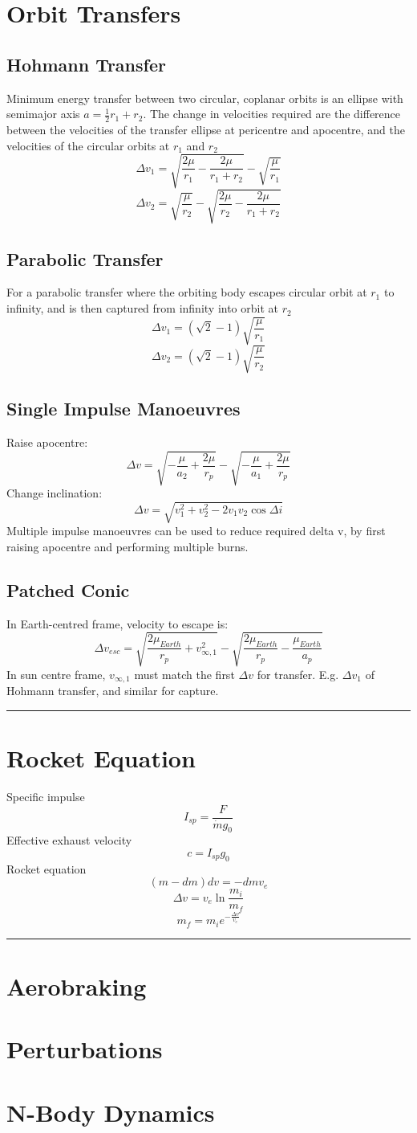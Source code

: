 \documentclass[table,cmyk]{article}
\begin{document}
\begin{longtable}
\section*{Orbit Transfers}
\subsection*{Hohmann Transfer}
Minimum energy transfer between two circular, coplanar orbits is an ellipse with semimajor axis $a = \frac{1}{2}r_1 + r_2$. The change in velocities required are the difference between the velocities of the transfer ellipse at pericentre and apocentre, and the velocities of the circular orbits at $r_1$ and $r_2$
\[\Delta v_1 = \sqrt{\frac{2\mu}{r_1}-\frac{2\mu}{r_1+r_2}}-\sqrt{\frac{\mu}{r_1}}\]
\[\Delta v_2 = \sqrt{\frac{\mu}{r_2}}-\sqrt{\frac{2\mu}{r_2}-\frac{2\mu}{r_1+r_2}}\]
\subsection*{Parabolic Transfer}
For a parabolic transfer where the orbiting body escapes circular orbit at $r_1$ to infinity, and is then captured from infinity into orbit at $r_2$
\[\Delta v_1 = (\sqrt{2}-1)\sqrt{\frac{\mu}{r_1}}\]
\[\Delta v_2 = (\sqrt{2}-1)\sqrt{\frac{\mu}{r_2}}\]
\subsection*{Single Impulse Manoeuvres}
Raise apocentre:
\[\Delta v = \sqrt{-\frac{\mu}{a_2}+\frac{2\mu}{r_p}}-\sqrt{-\frac{\mu}{a_1}+\frac{2\mu}{r_p}}\]
Change inclination:
\[\Delta v = \sqrt{v_1^2+v_2^2-2v_1v_2\cos \Delta i}\]
Multiple impulse manoeuvres can be used to reduce required delta v, by first raising apocentre and performing multiple burns.
\subsection*{Patched Conic}
In Earth-centred frame, velocity to escape is:
\[\Delta v_{esc} = \sqrt{\frac{2\mu_{Earth}}{r_p}+v_{\infty,1}^2}-\sqrt{\frac{2\mu_{Earth}}{r_p}-\frac{\mu_{Earth}}{a_p}}\]
\tabularnewline\hline
In sun centre frame, $v_{\infty,1}$ must match the first $\Delta v$ for transfer. E.g. $\Delta v_1$ of Hohmann transfer, and similar for capture.
\noindent\rule{9cm}{0.4pt}
\section*{Rocket Equation}
Specific impulse
\[I_{sp} = \frac{F}{\dot{m}g_0}\]
Effective exhaust velocity
\[c=I_{sp}g_0\]
Rocket equation
\[(m-dm)dv = -dmv_e\]
\[\Delta v = v_e \ln \frac{m_i}{m_f}\]
\[m_f = m_i e^{-\frac{\Delta v}{v_e}}\]
\noindent\rule{9cm}{0.4pt}
\section*{Aerobraking}
\section*{Perturbations}
\section*{N-Body Dynamics}

\tabularnewline\hline
\end{longtable}
\end{document}
